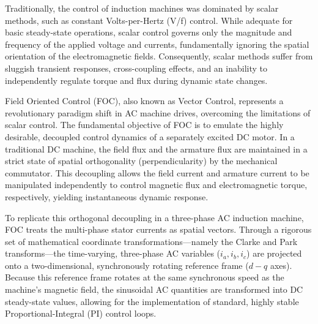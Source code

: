 \documentclass[12pt]{article}
\begin{document}
Traditionally, the control of induction machines was dominated by scalar methods, such as constant Volts-per-Hertz (V/f) control. While adequate for basic steady-state operations, scalar control governs only the magnitude and frequency of the applied voltage and currents, fundamentally ignoring the spatial orientation of the electromagnetic fields. Consequently, scalar methods suffer from sluggish transient responses, cross-coupling effects, and an inability to independently regulate torque and flux during dynamic state changes.

Field Oriented Control (FOC), also known as Vector Control, represents a revolutionary paradigm shift in AC machine drives, overcoming the limitations of scalar control. The fundamental objective of FOC is to emulate the highly desirable, decoupled control dynamics of a separately excited DC motor. In a traditional DC machine, the field flux and the armature flux are maintained in a strict state of spatial orthogonality (perpendicularity) by the mechanical commutator. This decoupling allows the field current and armature current to be manipulated independently to control magnetic flux and electromagnetic torque, respectively, yielding instantaneous dynamic response.

To replicate this orthogonal decoupling in a three-phase AC induction machine, FOC treats the multi-phase stator currents as spatial vectors. Through a rigorous set of mathematical coordinate transformations—namely the Clarke and Park transforms—the time-varying, three-phase AC variables ($i_a, i_b, i_c$) are projected onto a two-dimensional, synchronously rotating reference frame ($d-q$ axes). Because this reference frame rotates at the same synchronous speed as the machine's magnetic field, the sinusoidal AC quantities are transformed into DC steady-state values, allowing for the implementation of standard, highly stable Proportional-Integral (PI) control loops.
\end{document}
